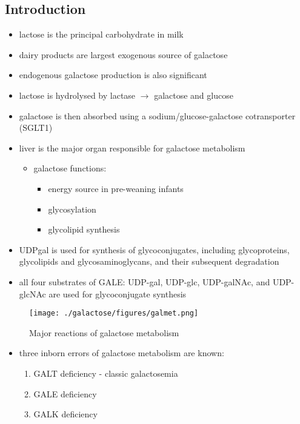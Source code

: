 \documentclass{scrartcl}
\begin{document}
\subsection{Introduction}
\label{sec:org9087dae}
\begin{itemize}
\item lactose is the principal carbohydrate in milk
\item dairy products are largest exogenous source of galactose
\item endogenous galactose production is also significant
\item lactose is hydrolysed by lactase \(\to\) galactose and glucose
\item galactose is then absorbed using a sodium/glucose-galactose cotransporter (SGLT1)
\item liver is the major organ responsible for galactose metabolism
\begin{itemize}
\item galactose functions:
\begin{itemize}
\item energy source in pre-weaning infants
\item glycosylation
\item glycolipid synthesis
\end{itemize}
\end{itemize}

\item UDPgal is used for synthesis of glycoconjugates, including
glycoproteins, glycolipids and glycosaminoglycans, and their
subsequent degradation
\item all four substrates of GALE: UDP-gal, UDP-glc, UDP-galNAc, and
UDP-glcNAc are used for glycoconjugate synthesis
\end{itemize}

\begin{figure}[htbp]
\centering
\texttt{[image: ./galactose/figures/galmet.png]}
\caption{\label{fig:orgf69c005}
Major reactions of galactose metabolism}
\end{figure}

\begin{itemize}
\item three inborn errors of galactose metabolism are known:
\begin{enumerate}
\item GALT deficiency - classic galactosemia
\item GALE deficiency
\item GALK deficiency
\end{enumerate}
\end{itemize}
\end{document}
